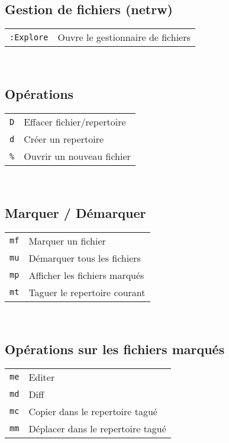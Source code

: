 \documentclass[8pt,landscape,a4paper]{article}
\begin{document}
\begin{multicols*}{3}
    \section{Gestion de fichiers (netrw) }
    \begin{tabular}{m{2cm} l}
        \texttt{:Explore} & Ouvre le gestionnaire de fichiers\\
    \end{tabular}\\
    \subsection{ Opérations}
    \begin{tabular}{m{2cm} l}
        \texttt{D} & Effacer fichier/repertoire\\
        \texttt{d} & Créer un repertoire\\
        \texttt{\%} & Ouvrir un nouveau fichier\\
    \end{tabular}\\
    \subsection{ Marquer / Démarquer}
    \begin{tabular}{m{2cm} l}
        \texttt{mf} & Marquer un fichier\\
        \texttt{mu} & Démarquer tous les fichiers\\
        \texttt{mp} & Afficher les fichiers marqués\\
        \texttt{mt} & Taguer le repertoire courant\\
    \end{tabular}\\
    \subsection{ Opérations sur les fichiers marqués}
    \begin{tabular}{m{2cm} l}
        \texttt{me} & Editer\\
        \texttt{md} & Diff\\
        \texttt{mc} & Copier dans le repertoire tagué\\
        \texttt{mm} & Déplacer dans le repertoire tagué\\
    \end{tabular}\\

\end{multicols*}
\newpage
\end{document}

